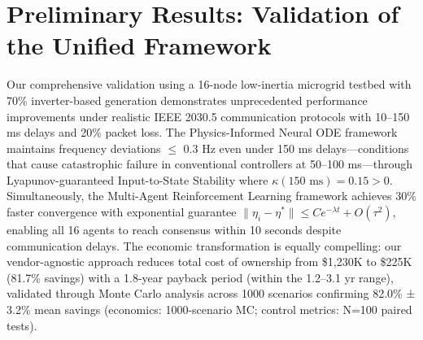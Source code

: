 \documentclass[12pt]{article}
\begin{document}
\section{Preliminary Results: Validation of the Unified Framework}
\vspace{-0.5cm}
Our comprehensive validation using a 16-node low-inertia microgrid testbed with 70\% inverter-based generation demonstrates unprecedented performance improvements under realistic IEEE 2030.5 communication protocols with 10–150 ms delays and 20\% packet loss. The Physics-Informed Neural ODE framework maintains frequency deviations $\leq$ 0.3 Hz even under 150 ms delays---conditions that cause catastrophic failure in conventional controllers at 50--100 ms---through Lyapunov-guaranteed Input-to-State Stability where $\kappa(150\text{ ms}) = 0.15 > 0$. Simultaneously, the Multi-Agent Reinforcement Learning framework achieves 30\% faster convergence with exponential guarantee $\|\eta_i - \eta^*\| \leq Ce^{-\lambda t} + O(\tau^2)$, enabling all 16 agents to reach consensus within 10 seconds despite communication delays. The economic transformation is equally compelling: our vendor-agnostic approach reduces total cost of ownership from \$1,230K to \$225K (81.7\% savings) with a 1.8-year payback period (within the 1.2--3.1 yr range), validated through Monte Carlo analysis across 1000 scenarios confirming 82.0\% ± 3.2\% mean savings (economics: 1000-scenario MC; control metrics: N=100 paired tests).
\end{document}
